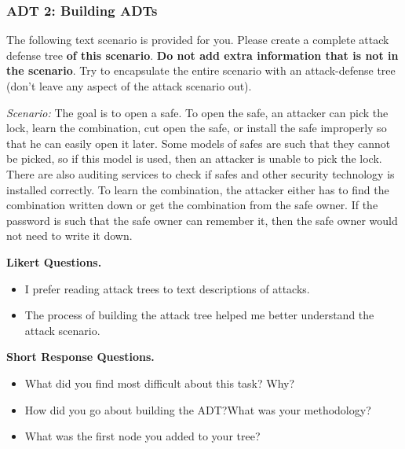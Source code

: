 \subsubsection*{ADT 2: Building ADTs}
The following text scenario is provided for you. Please create a complete attack defense tree \textbf{of this scenario}. \textbf{Do not add extra information that is not in the scenario}. Try to encapsulate the entire scenario with an attack-defense tree (don't leave any aspect of the attack scenario out).

\emph{Scenario:} 
The goal is to open a safe. To open the safe, an attacker can pick the lock,
learn the combination, cut open the safe, or install the safe improperly so
that he can easily open it later. Some models of safes are such that they cannot be picked, so if this model is used, then an attacker is unable to pick the lock. There are also auditing services to check if safes and other security technology is installed correctly. To learn the combination, the attacker
either has to find the combination written down or get the combination
from the safe owner. If the password is such that the safe owner can remember it, then the safe owner would not need to write it down.




\noindent\textbf{Likert Questions.}
\begin{itemize}
  \setlength{\itemindent}{\qIndent}
  \item[\surveyq{LS-ADT\revised{2}-L1}] I prefer reading attack trees to text descriptions of attacks.
  \item[\surveyq{LS-ADT\revised{2}-L2}] The process of building the attack tree helped me better understand the attack scenario.
\end{itemize}

\noindent\textbf{Short Response Questions.}
\begin{itemize}
  \setlength{\itemindent}{\qIndent}
  \item[\surveyq{LS-ADT\revised{2}-W1}] What did you find most difficult about this task? Why?
  \item[\surveyq{LS-ADT\revised{2}-W2}] How did you go about building the ADT?\@ What was your methodology?
  \item[\surveyq{LS-ADT\revised{2}-W3}] What was the first node you added to your tree?
\end{itemize}




